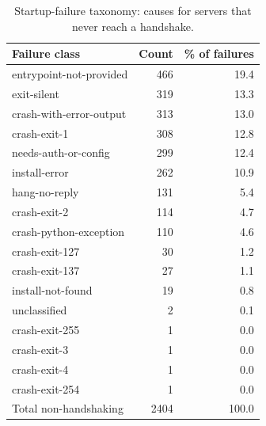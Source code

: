 \begin{table}[t]
\centering
\caption{Startup-failure taxonomy: causes for servers that never reach a handshake.}
\label{tab:startup}
\begin{tabular}{lrr}
\toprule
Failure class & Count & \% of failures \\
\midrule
entrypoint-not-provided & 466 & 19.4 \\
exit-silent & 319 & 13.3 \\
crash-with-error-output & 313 & 13.0 \\
crash-exit-1 & 308 & 12.8 \\
needs-auth-or-config & 299 & 12.4 \\
install-error & 262 & 10.9 \\
hang-no-reply & 131 & 5.4 \\
crash-exit-2 & 114 & 4.7 \\
crash-python-exception & 110 & 4.6 \\
crash-exit-127 & 30 & 1.2 \\
crash-exit-137 & 27 & 1.1 \\
install-not-found & 19 & 0.8 \\
unclassified & 2 & 0.1 \\
crash-exit-255 & 1 & 0.0 \\
crash-exit-3 & 1 & 0.0 \\
crash-exit-4 & 1 & 0.0 \\
crash-exit-254 & 1 & 0.0 \\
\midrule
Total non-handshaking & 2404 & 100.0 \\
\bottomrule
\end{tabular}
\end{table}